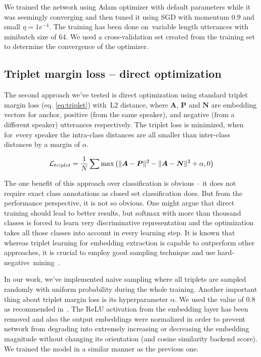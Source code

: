 \noindent
We trained the network using Adam optimizer with default parameters while it was seemingly converging and then tuned it using SGD with momentum $ 0.9 $ and small $ \eta = 1e^{-4} $. The training has been done on~variable length utterances with minibatch size of 64. We used a cross-validation set created from the training set to determine the convergence of the optimizer.

\subsection*{Triplet margin loss -- direct optimization}

The second approach we've tested is direct optimization using standard triplet margin loss (eq. \ref{eq:triplet}) with~L2 distance, where $ \boldsymbol{A} $, $ \boldsymbol{P} $ and $ \boldsymbol{N} $ are embedding vectors for anchor, positive (from the same speaker), and negative (from a different speaker) utterances respectively. The triplet loss is minimized, when for~every speaker the intra-class distances are all smaller than inter-class distances by a margin of $ \alpha $.

\begin{equation} \label{eq:triplet}
\mathcal{L}_{triplet} = \frac{1}{N} \sum \textnormal{max}
\left(
\lVert\boldsymbol{A} - \boldsymbol{P}\rVert^2 -
\lVert\boldsymbol{A} - \boldsymbol{N}\rVert^2
+ \alpha, 0 \right)
\end{equation}

\noindent
The one benefit of this approach over classification is obvious -- it does not require exact class annotations as closed set classification does. But from the performance perspective, it is not so obvious. One might argue that direct training should lead to better results, but softmax with more than thousand classes is forced to learn very discriminative representation and the optimization takes all those classes into account in every learning step. It is known that whereas triplet learning for embedding extraction is capable to outperform other approaches, it is crucial to employ good sampling technique and use hard-negative~mining~\cite{YuanYZ16}.

\medskip
In our work, we've implemented naive sampling where all triplets are sampled randomly with uniform probability during the whole training. Another important thing about triplet margin loss is its hyperparameter $ \alpha $. We used the value of 0.8 as recommended in~\cite{x_vectors_triplet}. The ReLU activation from the embedding layer has been removed and also the output embeddings were normalized in order to prevent network from degrading into extremely increasing or decreasing the embedding magnitude without changing its orientation (and cosine similarity backend score). We trained the model in a similar manner as the previous one.


